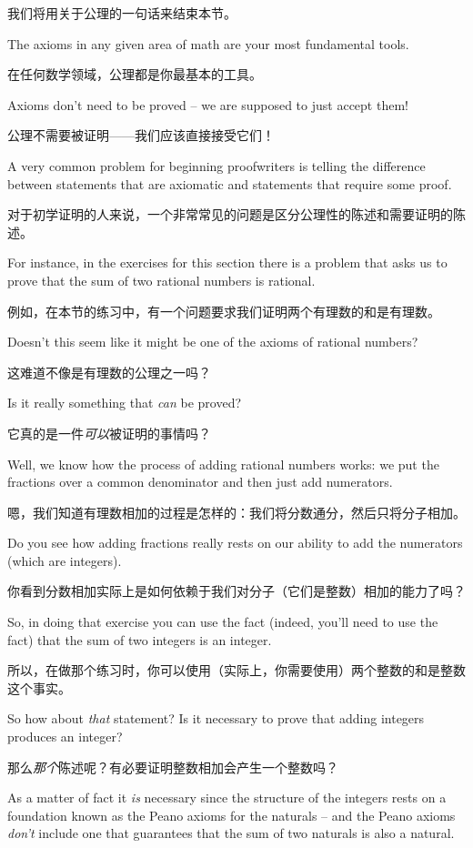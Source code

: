 我们将用关于公理的一句话来结束本节。

The axioms in any
given area of math are your most fundamental tools.

在任何数学领域，公理都是你最基本的工具。

Axioms don't
need to be proved -- we are supposed to just accept them!

公理不需要被证明——我们应该直接接受它们！

A very common 
problem for beginning proofwriters is telling the difference between statements
that are axiomatic and statements that require some proof.

对于初学证明的人来说，一个非常常见的问题是区分公理性的陈述和需要证明的陈述。

For instance, in the
exercises for this section there is a problem that asks us to prove that the sum of
two rational numbers is rational.

例如，在本节的练习中，有一个问题要求我们证明两个有理数的和是有理数。

Doesn't this seem like it might be one of
the axioms of rational numbers?

这难道不像是有理数的公理之一吗？

Is it really something that {\em can} be proved?

它真的是一件{\em 可以}被证明的事情吗？

Well, we know how the process of adding rational numbers works: we put the
fractions over a common
denominator and then just add numerators.

嗯，我们知道有理数相加的过程是怎样的：我们将分数通分，然后只将分子相加。

Do you see how adding fractions really rests
on our ability to add the numerators (which are integers).

你看到分数相加实际上是如何依赖于我们对分子（它们是整数）相加的能力了吗？

So, in doing that exercise you
can use the fact (indeed, you'll need to use the fact) that the sum of two integers is an integer.

所以，在做那个练习时，你可以使用（实际上，你需要使用）两个整数的和是整数这个事实。

So how about {\em that} statement?  Is it necessary to prove that adding integers produces 
an integer?

那么{\em 那个}陈述呢？有必要证明整数相加会产生一个整数吗？

As a matter of fact it {\em is} necessary since the structure of the integers 
rests on a foundation known as the Peano axioms for the naturals -- and the Peano axioms
{\em don't} include one that guarantees that the sum of two naturals is also a natural.

